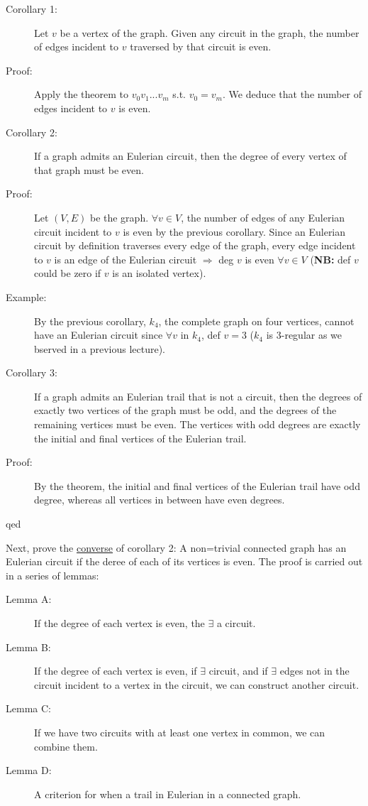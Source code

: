 \documentclass[10pt]{article}
\begin{document}
\begin{description}
		\item[Corollary 1:] Let $v$ be a vertex of the graph. Given any circuit in the graph, the number of edges incident to $v$ traversed by that circuit is even.
		\item[Proof:] Apply the theorem to $v_0 v_1 ... v_m$ s.t. $v_0 = v_m$. We deduce that the number of edges incident to $v$ is even.
		\item[Corollary 2:] If a graph admits an Eulerian circuit, then the degree of every vertex of that graph must be even.
		\item[Proof:] Let $(V, E)$ be the graph. $\forall v \in V$, the number of edges of any Eulerian circuit incident to $v$ is even by the previous corollary. Since an Eulerian circuit by definition traverses every edge of the graph, every edge incident to $v$ is an edge of the Eulerian circuit $\Rightarrow$ deg $v$ is even $\forall v \in V$ (\textbf{NB:} def $v$ could be zero if $v$ is an isolated vertex).
		\item[Example:] By the previous corollary, $k_4$, the complete graph on four vertices, cannot have an Eulerian circuit since $\forall v$ in $k_4$, def $v = 3$ ($k_4$ is 3-regular as we bserved in a previous lecture).
		\item[Corollary 3:] If a graph admits an Eulerian trail that is not a circuit, then the degrees of exactly two vertices of the graph must be odd, and the degrees of the remaining vertices must be even. The vertices with odd degrees are exactly the initial and final vertices of the Eulerian trail.
		\item[Proof:] By the theorem, the initial and final vertices of the Eulerian trail have odd degree, whereas all vertices in between have even degrees.
		\item[qed] 
	\end{description}
	Next, prove the \underline{converse} of corollary 2: A non=trivial connected graph has an Eulerian circuit if the deree of each of its vertices is even. The proof is carried out in a series of lemmas:
	\begin{description}
		\item[Lemma A:] If the degree of each vertex is even, the $\exists$ a circuit.
		\item[Lemma B:] If the degree of each vertex is even, if $\exists$ circuit, and if $\exists$ edges not in the circuit incident to a vertex in the circuit, we can construct another circuit.
		\item[Lemma C:] If we have two circuits with at least one vertex in common, we can combine them.
		\item[Lemma D:] A criterion for when a trail in Eulerian in a connected graph.
	\end{description}
\end{document}
